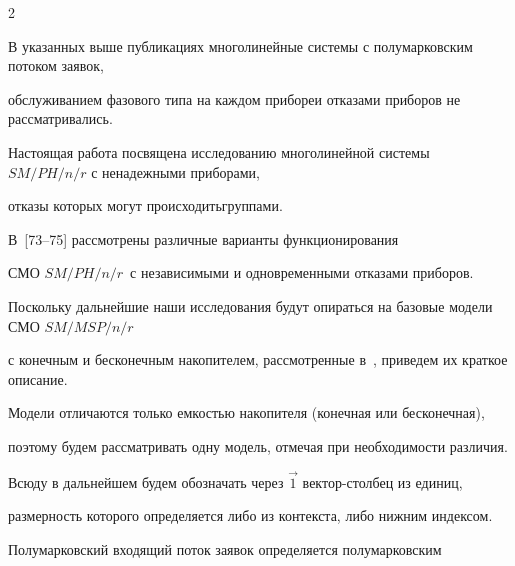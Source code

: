\begin{multicols}{2}









В указанных выше публикациях многолинейные системы с полумарковским потоком заявок,


обслуживанием фазового типа на каждом приборе\linebreak и отказами приборов не рассматривались.


На\-сто\-ящая работа посвящена исследованию многолинейной системы $SM/PH/n/r$ с ненадежными приборами,


отказы которых могут происходить\linebreak группами.


В~[73--75] рассмотрены различные варианты функционирования


СМО $SM/PH/n/r$\ с независимыми и одновременными отказами приборов.


{





}





Поскольку дальнейшие наши исследования будут опираться на базовые модели СМО $SM/MSP/n/r$


с конечным и бесконечным накопителем, рассмотренные в~\cite{PSC07_1, PC04}, приведем их краткое описание.


Модели отличаются только емкостью накопителя (конечная или бесконечная),


поэтому будем рассматривать одну модель, отмечая при необходимости различия.





Всюду в дальнейшем будем обозначать через $\vec1$ вектор-столбец из единиц,


размерность которого определяется либо из контекста, либо нижним индексом.





Полумарковский входящий поток заявок определяется полумарковским



\end{multicols}
